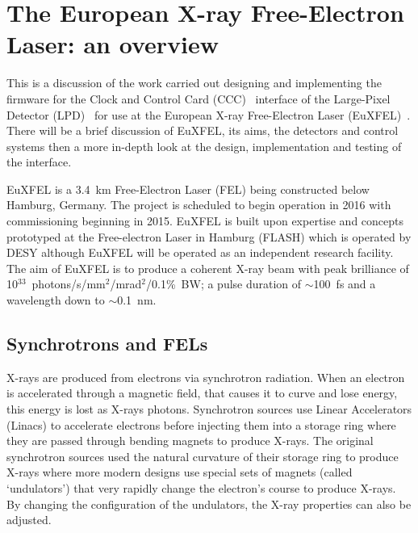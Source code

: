 \section{The European X-ray Free-Electron Laser: an overview} %
\label{sec:xfel_an_overview}
This is a discussion of the work carried out designing and implementing the firmware for the Clock and Control Card (CCC)~\cite{ccc_spec} interface of the Large-Pixel Detector (LPD)~\cite{lpd_spec} for use at the European X-ray Free-Electron Laser (EuXFEL)~\cite{xfel_tdr}. There will be a brief discussion of EuXFEL, its aims, the detectors and control systems then a more in-depth look at the design, implementation and testing of the interface.

EuXFEL is a 3.4~km Free-Electron Laser (FEL) being constructed below Hamburg, Germany. The project is scheduled to begin operation in 2016 with commissioning beginning in 2015. EuXFEL is built upon expertise and concepts prototyped at the Free-electron Laser in Hamburg (FLASH) which is operated by DESY although EuXFEL will be operated as an independent research facility. The aim of EuXFEL is to produce a coherent X-ray beam with peak brilliance of 10\(^{33}\)~photons/s/mm\(^2\)/mrad\(^2\)/0.1\%~BW; a pulse duration of \( \sim \)100~fs and a wavelength down to \( \sim \)0.1~nm.


\subsection{Synchrotrons and FELs} %
\label{sub:synchrotrons_and_fels}
X-rays are produced from electrons via synchrotron radiation. When an electron is accelerated through a magnetic field, that causes it to curve and lose energy, this energy is lost as X-rays photons. Synchrotron sources use Linear Accelerators (Linacs) to accelerate electrons before injecting them into a storage ring where they are passed through bending magnets to produce X-rays. The original synchrotron sources used the natural curvature of their storage ring to produce X-rays where more modern designs use special sets of magnets (called `undulators') that very rapidly change the electron's course to produce X-rays. By changing the configuration of the undulators, the X-ray properties can also be adjusted. 

